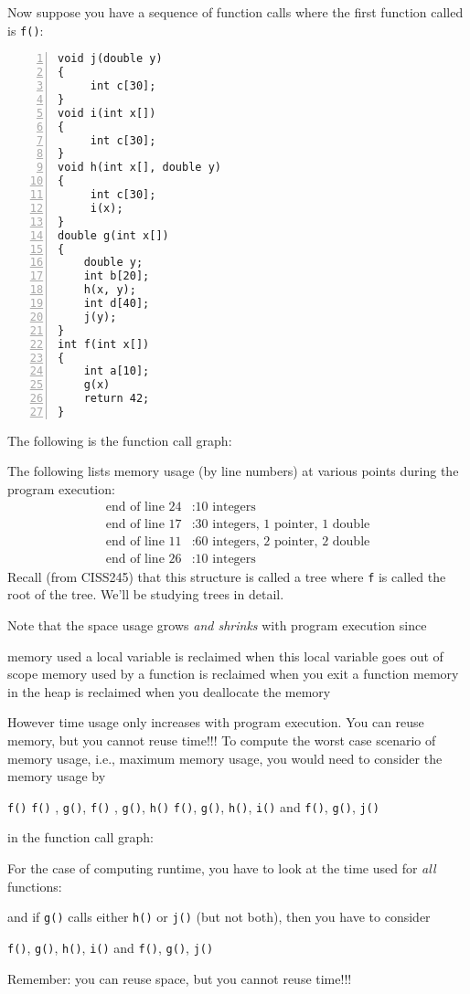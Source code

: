 \newpage
 

\newpage
Now suppose you have a sequence of function calls where the first function
called is \verb!f()!:
\begin{Verbatim}[frame=single,fontsize=\footnotesize,numbers=left]
void j(double y)
{
     int c[30];
}
void i(int x[])
{
     int c[30];
}
void h(int x[], double y)
{
     int c[30];
     i(x);
}
double g(int x[])
{
    double y;
    int b[20];
    h(x, y);
    int d[40];
    j(y);
}
int f(int x[])
{
    int a[10];
    g(x)
    return 42;
}
\end{Verbatim}
The following is the function call graph:

The following lists memory usage (by line numbers) at various points
during the program execution:
\begin{align*}
  \text{end of line 24}&: \text{10 integers} \\
  \text{end of line 17}&: \text{30 integers, 1 pointer, 1 double} \\
  \text{end of line 11}&: \text{60 integers, 2 pointer, 2 double} \\
  \text{end of line 26}&: \text{10 integers}
\end{align*}
Recall (from CISS245) that this structure is called a tree where \verb!f! is called the root
of the tree.
We'll be studying trees in detail.

Note that the space usage grows \textit{and shrinks} with program execution since
\begin{enumerate}[nosep]
  \li
  memory used a local variable is reclaimed when this local variable
  goes out of scope
  \li
  memory used by a function is reclaimed when you exit a function
  \li 
  memory in the heap is reclaimed when you deallocate the memory
\end{enumerate}
However time usage only increases with program execution.
You can reuse memory, but you cannot reuse time!!!
To compute the worst case scenario of memory usage, i.e., maximum memory usage,
you would need to consider the
memory usage by
\begin{enumerate}[nosep]  
  \li \verb!f()!
  \li \verb!f()! , \verb!g()!, 
  \li \verb!f()! , \verb!g()!, \verb!h()!
  \li \verb!f()!, \verb!g()!, \verb!h()!, \verb!i()! and
  \li \verb!f()!, \verb!g()!, \verb!j()!
\end{enumerate}
in the function call graph:

For the case of computing runtime, you have to look at the time used
for \textit{all} functions:

and if \verb!g()! calls either \verb!h()! or \verb!j()! (but not both),
then you have to consider
\begin{enumerate}[nosep]  
  \li \verb!f()!, \verb!g()!, \verb!h()!, \verb!i()! and
  \li \verb!f()!, \verb!g()!, \verb!j()!
\end{enumerate}

Remember: you can reuse space, but you cannot reuse time!!!

\newpage
\newpage
\newpage

%
